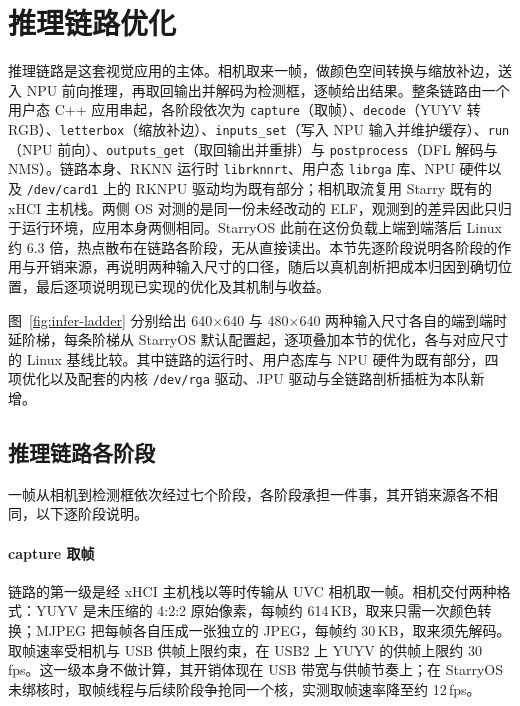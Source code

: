 \section{推理链路优化}

推理链路是这套视觉应用的主体。相机取来一帧，做颜色空间转换与缩放补边，送入 NPU 前向推理，再取回输出并解码为检测框，逐帧给出结果。整条链路由一个用户态 C++ 应用串起，各阶段依次为 \texttt{capture}（取帧）、\texttt{decode}（YUYV 转 RGB）、\texttt{letterbox}（缩放补边）、\texttt{inputs\_set}（写入 NPU 输入并维护缓存）、\texttt{run}（NPU 前向）、\texttt{outputs\_get}（取回输出并重排）与 \texttt{postprocess}（DFL 解码与 NMS）。链路本身、RKNN 运行时 \texttt{librknnrt}、用户态 \texttt{librga} 库、NPU 硬件以及 \texttt{/dev/card1} 上的 RKNPU 驱动均为既有部分；相机取流复用 Starry 既有的 xHCI 主机栈。两侧 OS 对测的是同一份未经改动的 ELF，观测到的差异因此只归于运行环境，应用本身两侧相同。StarryOS 此前在这份负载上端到端落后 Linux 约 6.3 倍，热点散布在链路各阶段，无从直接读出。本节先逐阶段说明各阶段的作用与开销来源，再说明两种输入尺寸的口径，随后以真机剖析把成本归因到确切位置，最后逐项说明现已实现的优化及其机制与收益。


图~\ref{fig:infer-ladder} 分别给出 640×640 与 480×640 两种输入尺寸各自的端到端时延阶梯，每条阶梯从 StarryOS 默认配置起，逐项叠加本节的优化，各与对应尺寸的 Linux 基线比较。其中链路的运行时、用户态库与 NPU 硬件为既有部分，四项优化以及配套的内核 \texttt{/dev/rga} 驱动、JPU 驱动与全链路剖析插桩为本队新增。

\subsection{推理链路各阶段}

一帧从相机到检测框依次经过七个阶段，各阶段承担一件事，其开销来源各不相同，以下逐阶段说明。

\paragraph{capture 取帧}
链路的第一级是经 xHCI 主机栈以等时传输从 UVC 相机取一帧。相机交付两种格式：YUYV 是未压缩的 4:2:2 原始像素，每帧约 614\,KB，取来只需一次颜色转换；MJPEG 把每帧各自压成一张独立的 JPEG，每帧约 30\,KB，取来须先解码。取帧速率受相机与 USB 供帧上限约束，在 USB2 上 YUYV 的供帧上限约 30\,fps。这一级本身不做计算，其开销体现在 USB 带宽与供帧节奏上；在 StarryOS 未绑核时，取帧线程与后续阶段争抢同一个核，实测取帧速率降至约 12\,fps。

